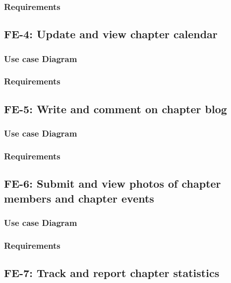\documentclass{article}
\begin{document}
\subsubsection{Requirements}

\subsection{FE-4: Update and view chapter calendar}

\subsubsection{Use case Diagram}

\subsubsection{Requirements}

\subsection{FE-5: Write and comment on chapter blog}

\subsubsection{Use case Diagram}

\subsubsection{Requirements}

\subsection{FE-6: Submit and view photos of chapter members and
  chapter events}

\subsubsection{Use case Diagram}

\subsubsection{Requirements}

\subsection{FE-7: Track and report chapter statistics}
\end{document}
